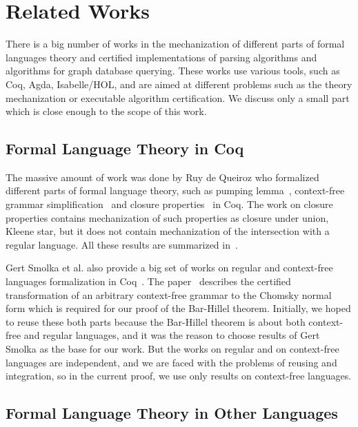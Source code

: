 \section{Related Works}
\label{sec:rel-work}

There is a big number of works in the mechanization of different parts of formal languages theory and certified implementations of parsing algorithms and algorithms for graph database querying.
These works use various tools, such as Coq, Agda, Isabelle/HOL, and are aimed at different problems such as the theory mechanization or executable algorithm certification.
We discuss only a small part which is close enough to the scope of this work.

\subsection{Formal Language Theory in Coq}

The massive amount of work was done by Ruy de Queiroz who formalized different parts of formal language theory, such as pumping lemma~\cite{ramos2015formalizationPumping}, context-free grammar simplification~\cite{ramos2015formalization} and closure properties~\cite{ramos2015formalizationClosure} in Coq.
The work on closure properties contains mechanization of such properties as closure under union, Kleene star, but it does not contain mechanization of the intersection with a regular language.
All these results are summarized in~\cite{ramos2016formalization}. 

Gert Smolka et al. also provide a big set of works on regular and context-free languages formalization in Coq~\cite{smolka2017regular,smolka2013regular,kaiser2012constructive,smolkaHofmann2016}.
The paper~\cite{smolkaHofmann2016} describes the certified transformation of an arbitrary context-free grammar to the Chomsky normal form which is required for our proof of the Bar-Hillel theorem. 
Initially, we hoped to reuse these both parts because the Bar-Hillel theorem is about both context-free and regular languages, and it was the reason to choose results of Gert Smolka as the base for our work.
But the works on regular and on context-free languages are independent, and we are faced with the problems of reusing and integration, so in the current proof, we use only results on context-free languages.

\subsection{Formal Language Theory in Other Languages}

